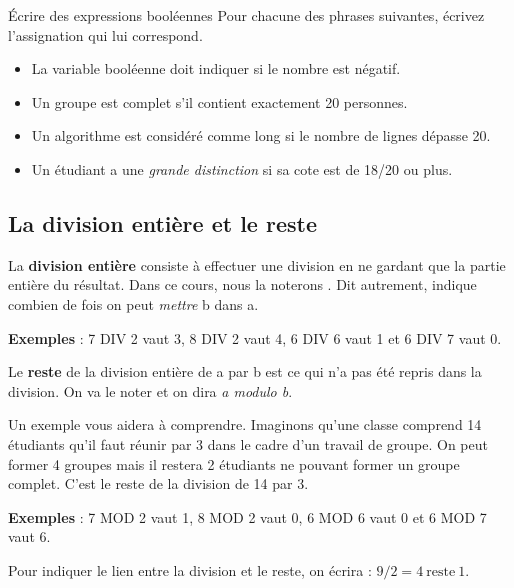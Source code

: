 			\begin{Exercice}{Écrire des expressions booléennes}
				Pour chacune des phrases suivantes,
				écrivez l'assignation qui lui correspond.
				\begin{itemize}
				\item 
					La variable booléenne 
					doit indiquer si le nombre  est négatif.
				\item
					Un groupe est complet s'il contient exactement 20 personnes.
				\item
					Un algorithme est considéré comme long si le nombre de lignes
					dépasse 20.
				\item 
					Un étudiant a une \emph{grande distinction} si sa cote est
					de 18/20 ou plus.
				\end{itemize}
			\end{Exercice}
			
		\subsection{La division entière et le reste}
		
			La \textbf{division entière} consiste à effectuer une division
			en ne gardant que la partie entière du résultat.
			Dans ce cours, nous la noterons .
			Dit autrement, 
			indique combien de fois on peut \emph{mettre} b dans a.
			
			\textbf{Exemples} :
			7 DIV 2 vaut 3, 8 DIV 2 vaut 4, 6 DIV 6 vaut 1 et 6 DIV 7 vaut 0.
			
			Le \textbf{reste} de la division entière de a par b
			est ce qui n'a pas été repris dans la division.
			On va le noter 
			et on dira \emph{a modulo b}.
	
			Un exemple vous aidera à comprendre.	
			Imaginons qu'une classe comprend 14 étudiants
			qu'il faut réunir par 3
			dans le cadre d'un travail de groupe.
			On peut former 4 groupes 
			mais il restera 2 étudiants ne pouvant former un groupe complet.
			C'est le reste de la division de 14 par 3.
			
			\textbf{Exemples} :
			7 MOD 2 vaut 1, 8 MOD 2 vaut 0, 6 MOD 6 vaut 0 et 6 MOD 7 vaut 6.
		
			Pour indiquer le lien entre la division et le reste,
			on écrira : $9/2 = 4\ \textrm{reste}\ 1$.
			
